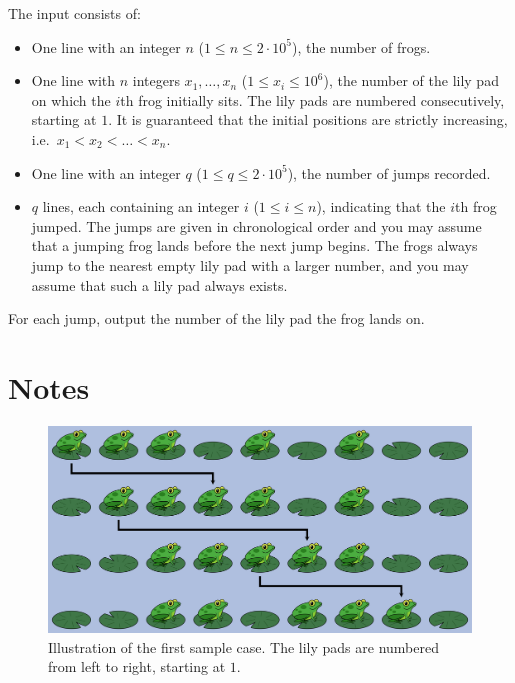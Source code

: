 \begin{Input}
	The input consists of:
	\begin{itemize}
		\item One line with an integer $n$ ($1\leq n \leq 2\cdot10^5$), the number of frogs.
		\item One line with $n$ integers $x_1,\dots, x_n$ ($1\leq x_i \leq 10^6$),
			the number of the lily pad on which the $i$th frog initially sits.
			The lily pads are numbered consecutively, starting at $1$. 
			It is guaranteed that the initial positions are strictly increasing, i.e.\
			$x_1 < x_2 < \dots < x_n$.
		\item One line with an integer $q$ ($1\leq q \leq 2\cdot10^5$), the
			number of jumps recorded.
		\item $q$ lines, each containing an integer $i$ ($1\leq i\leq n$), indicating
			that the $i$th frog jumped. The jumps are given in chronological
			order and you may assume that a jumping frog lands before the next
			jump begins.
			The frogs always jump to the nearest empty lily pad with a larger number,
			and you may assume that such a lily pad always exists.
	\end{itemize}
\end{Input}

\begin{Output}
	For each jump, output the number of the lily pad the frog lands on.
\end{Output}

\section*{Notes}
\begin{figure}[h]
	\centering
	\includegraphics[width=\textwidth]{sample}
	\caption{Illustration of the first sample case. The lily pads are
	numbered from left to right, starting at $1$.}
\end{figure}
